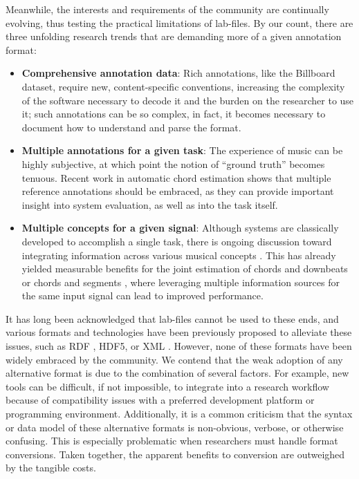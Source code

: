 Meanwhile, the interests and requirements of the community are continually evolving, thus testing the practical limitations of lab-files.
By our count, there are three unfolding research trends that are demanding more of a given annotation format:

\begin{itemize}
\item \textbf{Comprehensive annotation data}:
Rich annotations, like the Billboard dataset\cite{burgoyne2011expert}, require new, content-specific conventions, increasing the complexity of the software necessary to decode it and the burden on the researcher to use it; such annotations can be so complex, in fact, it becomes necessary to document how to understand and parse the format\cite{de2012parsing}.

\item \textbf{Multiple annotations for a given task}:
The experience of music can be highly subjective, at which point the notion of ``ground truth'' becomes tenuous.
Recent work in automatic chord estimation \cite{ni2013understanding} shows that multiple reference annotations should be embraced, as they can provide important insight into system evaluation, as well as into the task itself.

\item \textbf{Multiple concepts for a given signal}:
Although systems are classically developed to accomplish a single task, there is ongoing discussion toward integrating information across various musical concepts \cite{vincent2010roadmap}.
This has already yielded measurable benefits for the joint estimation of chords and downbeats \cite{papadopoulos2011joint} or chords and segments \cite{mauch2009using}, where leveraging multiple information sources for the same input signal can lead to improved performance.
\end{itemize}


\noindent It has long been acknowledged that lab-files cannot be used to these ends, and various formats and technologies have been previously proposed to alleviate these issues, such as RDF \cite{cannam2006sonic}, HDF5\cite{bertin2011million}, or XML \cite{mckay2005ace}.
However, none of these formats have been widely embraced by the community.
We contend that the weak adoption of any alternative format is due to the combination of several factors.
For example, new tools can be difficult, if not impossible, to integrate into a research workflow because of compatibility issues with a preferred development platform or programming environment.
Additionally, it is a common criticism that the syntax or data model of these alternative formats is non-obvious, verbose, or otherwise confusing.
This is especially problematic when researchers must handle format conversions.
Taken together, the apparent benefits to conversion are outweighed by the tangible costs.


